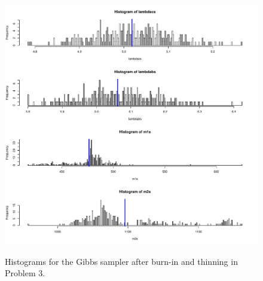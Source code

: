 \documentclass[12pt]{article}
\begin{document}
\begin{figure}[htp]
\centering
\includegraphics[width=6.5in]{marginals}
\label{fig:marginals}
\caption{Histograms for the Gibbs sampler after burn-in and thinning in Problem 3.}
\end{figure}
\end{document}
